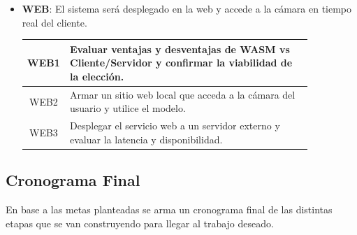 \documentclass[a4paper]{article}
\begin{document}
\begin{itemize}
\item \textbf{WEB}: El sistema será desplegado en la web y accede a la cámara en tiempo real del cliente.

\begin{center}
\begin{tabular}{c m{0.85\linewidth}} \toprule
    WEB1 & Evaluar ventajas y desventajas de WASM vs Cliente/Servidor y confirmar la viabilidad de la elección. \\ \midrule
    WEB2 & Armar un sitio web local que acceda a la cámara del usuario y utilice el modelo. \\ \midrule
    WEB3 & Desplegar el servicio web a un servidor externo y evaluar la latencia y disponibilidad. \\ \bottomrule
\end{tabular}
\end{center}
\end{itemize}

\subsection{Cronograma Final}

En base a las metas planteadas se arma un cronograma final de las distintas etapas que se van construyendo para llegar al trabajo deseado.
\end{document}
